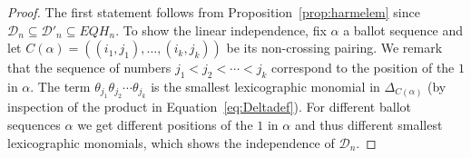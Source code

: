 \documentclass[11pt]{amsart}
\theoremstyle{definition}
\numberwithin{equation}{section}
\begin{document}
\begin{proof}
  The first statement follows from Proposition~\ref{prop:harmelem} since ${\mathcal D}_n \subseteq {\mathcal D}'_n \subseteq EQH_n$.
To show the linear independence, fix $\alpha$ a ballot sequence and let $C(\alpha)=((i_1,j_1),\ldots,(i_k,j_k))$ be its non-crossing pairing.  We remark that the sequence of numbers
$j_1<j_2<\cdots<j_k$ correspond to the position of the $1$ in $\alpha$.
The term $\theta_{j_1}\theta_{j_2}\cdots\theta_{j_k}$ is the smallest lexicographic
monomial in $\Delta_{C(\alpha)}$ (by inspection of the product in Equation~\eqref{eq:Deltadef}).
For different ballot sequences $\alpha$ we get different positions of the $1$ in
$\alpha$ and thus different smallest lexicographic monomials,
which shows the independence of ${\mathcal D}_n$.
\end{proof}
\end{document}
